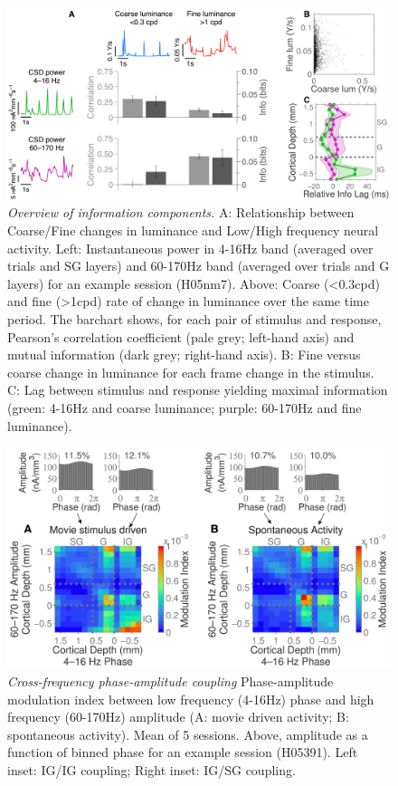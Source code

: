 \documentclass[english,a4paper]{article}
\begin{document}
\begin{figure}
\centering \includegraphics[width=\columnwidth]{fig6}
%
\caption{%
\textit{Overview of information components.}
A: Relationship between Coarse/Fine changes in luminance and Low/High frequency neural activity.
Left: Instantaneous power in 4-16Hz band (averaged over trials and SG layers) and 60-170Hz band (averaged over trials and G layers) for an example session (H05nm7).
Above: Coarse (<0.3cpd) and fine (>1cpd) rate of change in luminance over the same time period.
The barchart shows, for each pair of stimulus and response, Pearson's correlation coefficient (pale grey; left-hand axis) and mutual information (dark grey; right-hand axis).
B: Fine versus coarse change in luminance for each frame change in the stimulus.
C: Lag between stimulus and response yielding maximal information (green: 4-16Hz and coarse luminance; purple: 60-170Hz and fine luminance).
}
%
\end{figure}



\begin{figure}
\centering \includegraphics[width=\columnwidth]{fig8}
%
\caption{%
\textit{Cross-frequency phase-amplitude coupling}
Phase-amplitude modulation index between low frequency (4-16Hz) phase and high 
frequency (60-170Hz) amplitude (A: movie driven activity; B: spontaneous 
activity). Mean of 5 sessions.
Above, amplitude as a function of binned phase for an example session (H05391). 
Left inset: IG/IG coupling; Right inset: IG/SG coupling.
}
%
\end{figure}
\end{document}
